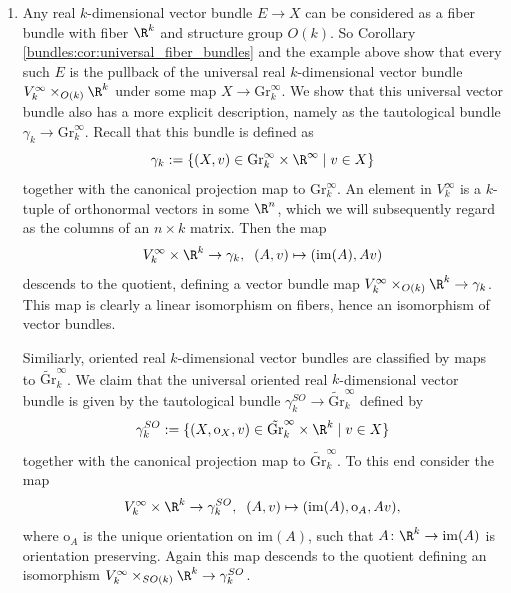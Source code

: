 \begin{example}
\begin{enumerate}[label=(\roman*)]
        \item \label{bundles:ex:examples_for_classifiying_spaces_universal_vector_bundle} Any real $k$-dimensional vector bundle $E \to X$ can be considered as a fiber bundle with fiber $\R^k$ and structure group $O(k)$. So Corollary \ref{bundles:cor:universal_fiber_bundles} and the example above show that every such $E$ is the pullback of the universal real $k$-dimensional vector bundle $V_k^\infty \times_{O(k)} \R^k$ under some map $X \to \mathrm{Gr}_k^\infty$. We show that this universal vector bundle also has a more explicit description, namely as the tautological bundle $\gamma_k \to \mathrm{Gr}_k^\infty$. Recall that this bundle is defined as 
        \[
        \gamma_k := \{(X,v) \in \mathrm{Gr}_k^\infty \times \R^\infty \mid v \in X\}
        \] 
        together with the canonical projection map to $\mathrm{Gr}_k^\infty$. An element in $V_k^\infty$ is a $k$-tuple of orthonormal vectors in some $\R^n$, which we will subsequently regard as the columns of an $n \times k$ matrix. Then the map 
        \[
        V_k^\infty \times \R^k \to \gamma_k, \;\; (A,v) \mapsto (\mathrm{im}(A), Av)
        \]
        descends to the quotient, defining a vector bundle map $V_k^\infty \times_{O(k)} \R^k \to \gamma_k$. This map is clearly a linear isomorphism on fibers, hence an isomorphism of vector bundles. 

        Similiarly, oriented real $k$-dimensional vector bundles are classified by maps to $\tilde{\mathrm{Gr}}_k^\infty$. We claim that the universal oriented real $k$-dimensional vector bundle is given by the tautological bundle $\gamma_k^{SO} \to \tilde{\mathrm{Gr}}_k^\infty$ defined by 
        \[
        \gamma_k^{SO} := \{(X,\mathrm{o}_X,v) \in \tilde{\mathrm{Gr}}_k^\infty \times \R^k \mid v \in X\}
        \]
        together with the canonical projection map to $\tilde{\mathrm{Gr}}_k^\infty$. To this end consider the map 
        \[
        V_k^\infty \times \R^k \to \gamma_k^{SO}, \;\; (A,v) \mapsto (\mathrm{im}(A), \mathrm{o}_A, Av),
        \]
        where $\mathrm{o}_A$ is the unique orientation on $\mathrm{im}(A)$, such that $A \colon \R^k \to \mathrm{im}(A)$ is orientation preserving. Again this map descends to the quotient defining an isomorphism $V_k^\infty \times_{SO(k)} \R^k \to \gamma_k^{SO}$.



         
        

\end{enumerate}
\end{example}
